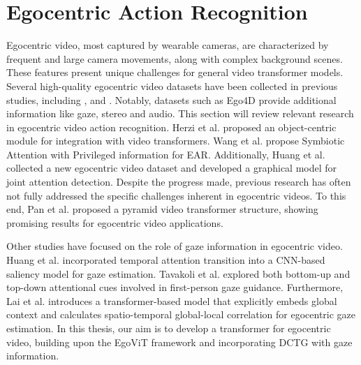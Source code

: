 \section{Egocentric Action Recognition}
\label{ear}
Egocentric video, most captured by wearable cameras, are characterized by frequent and large camera movements, along with complex background scenes.
These features present unique challenges for general video transformer models.
Several high-quality egocentric video datasets have been collected in previous studies, including \cite{damen_epic-kitchens_2021}, \cite{sigurdsson_charades-ego_2018} and \cite{sigurdsson_charades-ego_2018}.
Notably, datasets such as Ego4D \cite{grauman_ego4d_2022} provide additional information like gaze, stereo and audio.
This section will review relevant research in egocentric video action recognition. 
Herzi et al. \cite{herzig_object-region_2022} proposed an object-centric module for integration with video transformers.
Wang et al. \cite{wang_symbiotic_2020} propose Symbiotic Attention with Privileged information for EAR.
Additionally, Huang et al. \cite{huang_ego-vision_2020} collected a new egocentric video dataset and developed a graphical model for joint attention detection.
Despite the progress made, previous research has often not fully addressed the specific challenges inherent in egocentric videos.
To this end, Pan et al. \cite{pan_egovit_2023} proposed a pyramid video transformer structure, showing promising results for egocentric video applications.

Other studies have focused on the role of gaze information in egocentric video.
Huang et al. \cite{huang_predicting_2018} incorporated temporal attention transition into a CNN-based saliency model for gaze estimation.
Tavakoli et al. \cite{tavakoli_digging_2019} explored both bottom-up and top-down attentional cues involved in first-person gaze guidance.
Furthermore, Lai et al. \cite{lai_eye_2022} introduces a transformer-based model that explicitly embeds global context and calculates spatio-temporal global-local correlation for egocentric gaze estimation.
In this thesis, our aim is to develop a transformer for egocentric video, building upon the EgoViT framework and incorporating DCTG with gaze information.

